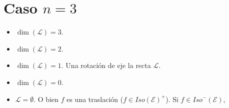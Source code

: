 \section{Caso $\displaystyle n = 3 $ }
\begin{itemize}
\item $\displaystyle \dim\left(\mathcal{L}\right) = 3 $.
\item $\displaystyle \dim\left(\mathcal{L}\right) = 2 $.
\item $\displaystyle \dim\left(\mathcal{L}\right) = 1 $. Una rotación de eje la recta $\displaystyle \mathcal{L} $.
\item $\displaystyle \dim\left(\mathcal{L}\right) = 0 $.
\item $\displaystyle \mathcal{L} = \emptyset $. O bien $\displaystyle f $ es una traslación ($\displaystyle f \in Iso\left(\mathcal{E}\right)^{+} $). Si $\displaystyle f \in Iso^{-}\left(\mathcal{E}\right) $, 
\end{itemize}
